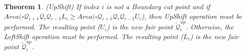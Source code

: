 \documentclass{article}
\newtheorem{theorem}{Theorem}[section]
\newcommand{\sd}[1]{ \textcolor{orange}{{\bf SD: }{``\em #1''}}}
\newcommand{\ouralgo}{\texttt{FROC}}
\newcommand{\ourdef}{-Equalized ROC}
\begin{document}
\begin{theorem}(UpShift)
    If index $i$ is not a Boundary cut point and if $Area(\square \mathcal{Q}_{i+1}\mathcal{Q}_{i}\mathcal{Q}_{i-1}{L}_i \ge Area(\square \mathcal{Q}_{i+1}\mathcal{Q}_{i}\mathcal{Q}_{i-1}{U}_i$), then UpShift operation must be performed. The resulting point ($U_i$) is the new fair point $\mathcal{\widetilde{Q}}_i^{up}$. Otherwise, the LeftShift operation must be performed. The resulting point ($L_i$) is the new fair point $\mathcal{\widetilde{Q}}_i^{up}$.
\end{theorem}
\end{document}
